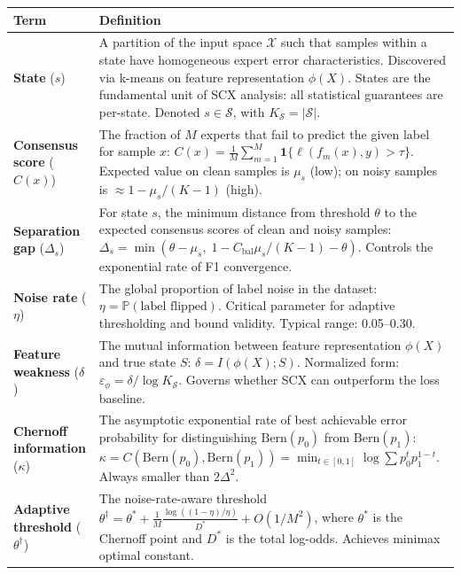 \documentclass{article}
\begin{document}
\begin{longtable}{p{} p{}}
\toprule
\textbf{Term} & \textbf{Definition} \\
\midrule
\endhead

\bottomrule
\endfoot

\textbf{State} ($s$) & A partition of the input space $\mathcal{X}$ such that samples within a state have homogeneous expert error characteristics. Discovered via k-means on feature representation $\phi(X)$. States are the fundamental unit of SCX analysis: all statistical guarantees are per-state. Denoted $s \in \mathcal{S}$, with $K_{\mathcal{S}} = |\mathcal{S}|$. \\

\textbf{Consensus score} ($C(x)$) & The fraction of $M$ experts that fail to predict the given label for sample $x$: $C(x) = \frac{1}{M}\sum_{m=1}^M \mathbf{1}\{\ell(f_m(x), y) > \tau\}$. Expected value on clean samples is $\mu_s$ (low); on noisy samples is $\approx 1 - \mu_s/(K-1)$ (high). \\

\textbf{Separation gap} ($\Delta_s$) & For state $s$, the minimum distance from threshold $\theta$ to the expected consensus scores of clean and noisy samples: $\Delta_s = \min(\theta - \mu_s,\; 1 - C_{\text{bal}}\mu_s/(K-1) - \theta)$. Controls the exponential rate of F1 convergence. \\

\textbf{Noise rate} ($\eta$) & The global proportion of label noise in the dataset: $\eta = \mathbb{P}(\text{label flipped})$. Critical parameter for adaptive thresholding and bound validity. Typical range: 0.05--0.30. \\

\textbf{Feature weakness} ($\delta$) & The mutual information between feature representation $\phi(X)$ and true state $S$: $\delta = I(\phi(X); S)$. Normalized form: $\varepsilon_\phi = \delta / \log K_{\mathcal{S}}$. Governs whether SCX can outperform the loss baseline. \\

\textbf{Chernoff information} ($\kappa$) & The asymptotic exponential rate of best achievable error probability for distinguishing $\text{Bern}(p_0)$ from $\text{Bern}(p_1)$: $\kappa = C(\text{Bern}(p_0), \text{Bern}(p_1)) = \min_{t\in[0,1]} \log \sum p_0^t p_1^{1-t}$. Always smaller than $2\Delta^2$. \\

\textbf{Adaptive threshold} ($\theta^\dagger$) & The noise-rate-aware threshold $\theta^\dagger = \theta^* + \frac{1}{M}\frac{\log((1-\eta)/\eta)}{D^*} + O(1/M^2)$, where $\theta^*$ is the Chernoff point and $D^*$ is the total log-odds. Achieves minimax optimal constant. \\


\end{longtable}
\end{document}

